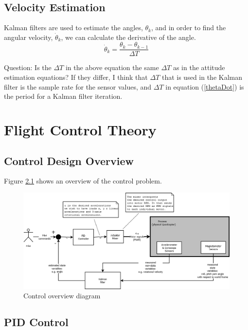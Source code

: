 \documentclass[a4paper]{report}
\begin{document}
	\section{Velocity Estimation}
	Kalman filters are used to estimate the angles, $\theta_{k}$, and in order to find the angular velocity, $\dot{\theta}_{k}$, we can calculate the derivative of the angle.
	\begin{equation}
	\label{thetaDot}
	\dot{\theta}_{k}=\frac{\theta_{k}-\theta_{k-1}}{\Delta T}
	\end{equation}

	Question: Is the $\Delta T$ in the above equation the same $\Delta T$ as in the attitude estimation equations? If they differ, I think that $\Delta T$ that is used in the Kalman filter is the sample rate for the sensor values, and $\Delta T$ in equation (\ref{thetaDot}) is the period for a Kalman filter iteration.

\chapter{Flight Control Theory}

	\section{Control Design Overview}

Figure \ref{fig:controloverview} shows an overview of the control problem.

\begin{figure}[h]
    \centering
    \includegraphics[scale=0.3]{images/ControlDiagram.png}
    \caption{Control overview diagram}
    \label{fig:controloverview}
\end{figure}

	\section{PID Control}
\end{document}
